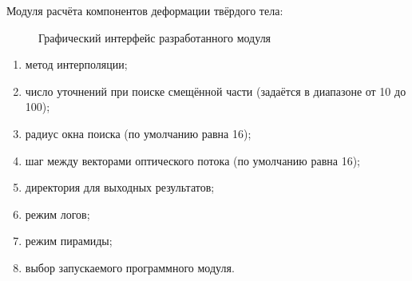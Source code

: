 Модуля расчёта компонентов деформации твёрдого тела:
\begin{figure}[h!]
\caption{Графический интерфейс разработанного модуля}
\label{pic:qml_screen}
\end{figure}
\begin{enumerate}
\item метод интерполяции;
\item число уточнений при поиске смещённой части (задаётся в диапазоне от 10 до 100);
\item радиус окна поиска (по умолчанию равна 16);
\item шаг между векторами оптического потока (по умолчанию равна 16);
\item директория для выходных результатов;
\item режим логов;
\item режим пирамиды;
\item выбор запускаемого программного модуля.
\end{enumerate}